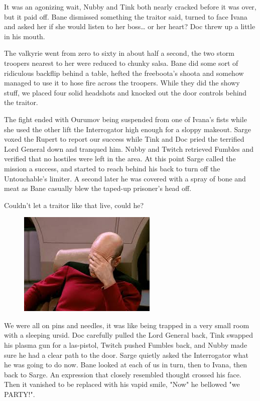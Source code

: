 It was an agonizing wait, Nubby and Tink both nearly cracked before it was over, but it paid off. 
Bane dismissed something the traitor said, turned to face Ivana and asked her if she would listen to her boss… or her heart? 
Doc threw up a little in his mouth.

The valkyrie went from zero to sixty in about half a second, the two storm troopers nearest to her were reduced to chunky salsa. 
Bane did some sort of ridiculous backflip behind a table, hefted the freeboota's shoota and somehow managed to use it to hose fire across the troopers. 
While they did the showy stuff, we placed four solid headshots and knocked out the door controls behind the traitor.

The fight ended with Ourumov being suspended from one of Ivana's fists while she used the other lift the Interrogator high enough for a sloppy makeout. 
Sarge voxed the Rupert to report our success while Tink and Doc pried the terrified Lord General down and tranqued him. 
Nubby and Twitch retrieved Fumbles and verified that no hostiles were left in the area. 
At this point Sarge called the mission a success, and started to reach behind his back to turn off the Untouchable's limiter. 
A second later he was covered with a spray of bone and meat as Bane casually blew the taped-up prisoner's head off.

Couldn't let a traitor like that live, could he?

\begin{figure}
	\begin{center}
		\includegraphics[width=\figwidth]{pics/9/58.png}
	\end{center}
\end{figure}
We were all on pins and needles, it was like being trapped in a very small room with a sleeping ursid. 
Doc carefully pulled the Lord General back, Tink swapped his plasma gun for a las-pistol, Twitch pushed Fumbles back, and Nubby made sure he had a clear path to the door. 
Sarge quietly asked the Interrogator what he was going to do now. 
Bane looked at each of us in turn, then to Ivana, then back to Sarge. 
An expression that closely resembled thought crossed his face. 
Then it vanished to be replaced with his vapid smile, "Now" he bellowed "we PARTY!".


